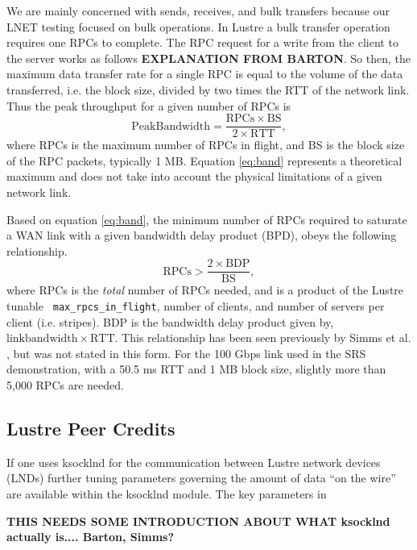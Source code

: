 \documentclass[]{sigplan-proc}
\begin{document}
We are mainly concerned with sends, receives, and bulk transfers because our LNET testing focused on bulk
operations. In Lustre a bulk transfer operation requires one RPCs to complete. The RPC request for a write
from the client to the server works as follows {\bf EXPLANATION FROM BARTON}. So then, the maximum data
transfer rate for a single RPC is equal to the volume of the data transferred, i.e. the block size, divided by
two times the RTT of the network link. Thus the peak throughput for a given number of RPCs is
\begin{equation}
\mathrm{Peak Bandwidth = \frac{RPCs \times BS}{2 \times RTT}},
\label{eq:band}
\end{equation}
where RPCs is the maximum number of RPCs in flight, and BS is the block size of the RPC packets, typically 1
MB. Equation \ref{eq:band} represents a theoretical maximum and does not take into account the physical
limitations of a given network link.

Based on equation \ref{eq:band}, the minimum number of RPCs required to saturate a WAN link with a given
bandwidth delay product (BPD), obeys the following relationship.
\begin{equation}
\mathrm{RPCs > \frac{2\times BDP}{BS},}
\label{eq:rpcs}
\end{equation}
where RPCs is the {\it total} number of RPCs needed, and is a product of the Lustre tunable {\tt
  max\_rpcs\_in\_flight}, number of clients, and number of servers per client (i.e. stripes). BDP is the
bandwidth delay product given by, $\mathrm{link bandwidth \times RTT}$. This relationship has been seen
previously by Simms et al. \cite{simms2007}, but was not stated in this form. For the 100 Gbps link used in
the SRS demonstration, with a 50.5 ms RTT and 1 MB block size, slightly more than 5,000 RPCs are needed.

\subsection{Lustre Peer Credits}

If one uses ksocklnd for the communication between Lustre network devices (LNDs) further tuning parameters
governing the amount of data ``on the wire'' are available within the ksocklnd module. The key parameters in

{\bf THIS NEEDS SOME INTRODUCTION ABOUT WHAT ksocklnd actually is.... Barton, Simms?}
\end{document}
